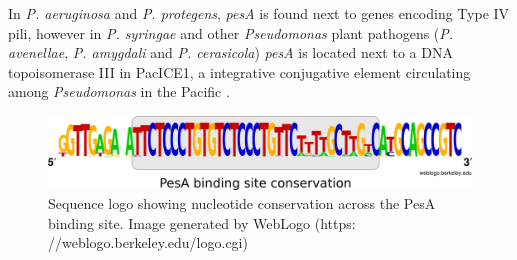 In \textit{P. aeruginosa} and \textit{P. protegens}, \textit{pesA} is found next to genes encoding Type IV pili, however in  \textit{P. syringae} and other \textit{Pseudomonas} plant pathogens (\textit{P. avenellae}, \textit{P. amygdali} and \textit{P. cerasicola}) \textit{pesA} is located next to a DNA topoisomerase III in PacICE1, a integrative conjugative element circulating among \textit{Pseudomonas} in the Pacific \citep{Colombi2017-zf,Colombi2017-yxxf}. 
\begin{figure}[H]
\includegraphics[scale=0.9]{psa/psa_ncRNA/PesA_binding_site_conservation_2.png}
    \caption[Sequence logo showing nucleotide conservation across the PesA binding site]{Sequence logo showing nucleotide conservation across the PesA binding site. Image generated by WebLogo (https$:$//weblogo.berkeley.edu/logo.cgi)}
    \label{fig:pesa_binding_site}
\end{figure}


